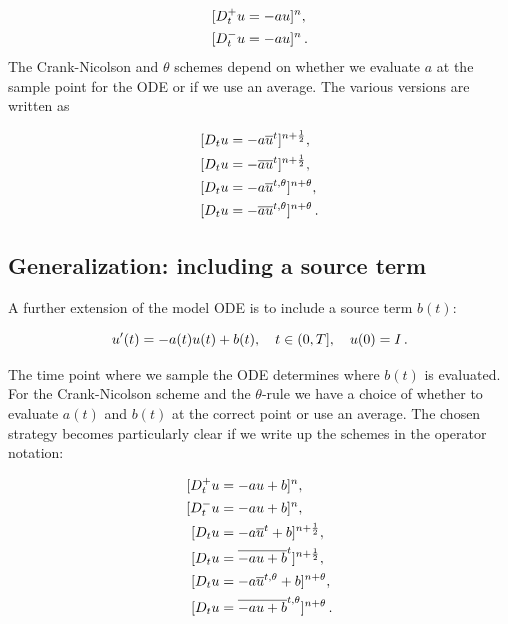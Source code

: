 \documentclass[%
oneside,                 %
final,                   %
10pt]{article}
\begin{document}
\begin{align}
\lbrack D^+_t u &= -au\rbrack^n,\\ 
\lbrack D^-_t u &= -au\rbrack^n
\thinspace .
\end{align}
The Crank-Nicolson and $\theta$ schemes depend on whether we evaluate
$a$ at the sample point for the ODE or if we use an average. The
various versions are written as

\begin{align}
\lbrack D_t u &= -a\overline{u}^t\rbrack^{n+\frac{1}{2}},\\ 
\lbrack D_t u &= -\overline{au}^t\rbrack^{n+\frac{1}{2}},\\ 
\lbrack D_t u &= -a\overline{u}^{t,\theta}\rbrack^{n+\theta},\\ 
\lbrack D_t u &= -\overline{au}^{t,\theta}\rbrack^{n+\theta}
\thinspace .
\end{align}


\subsection{Generalization: including a source term}
\label{decay:source}

A further extension of the model ODE is to include a source term $b(t)$:

\begin{equation}
u^{\prime}(t) = -a(t)u(t) + b(t),\quad t\in (0,T],\quad u(0)=I
\thinspace .
\label{decay:problem:ab}
\end{equation}

The time point where we sample the ODE determines where $b(t)$ is
evaluated. For the Crank-Nicolson scheme and the $\theta$-rule we
have a choice of whether to evaluate $a(t)$ and $b(t)$ at the
correct point or use an average. The chosen strategy becomes
particularly clear if we write up the schemes in the operator notation:

\begin{align}
\lbrack D^+_t u &= -au + b\rbrack^n,\\ 
\lbrack D^-_t u &= -au + b\rbrack^n,\\ 
\lbrack D_t u   &= -a\overline{u}^t + b\rbrack^{n+\frac{1}{2}},\\ 
\lbrack D_t u   &= \overline{-au+b}^t\rbrack^{n+\frac{1}{2}},\\ 
\lbrack D_t u   &= -a\overline{u}^{t,\theta} + b\rbrack^{n+\theta},\\ 
\lbrack D_t u   &= \overline{-au+b}^{t,\theta}\rbrack^{n+\theta}
\label{decay:problem:ab:theta:avg:all:op}
\thinspace .
\end{align}
\end{document}
